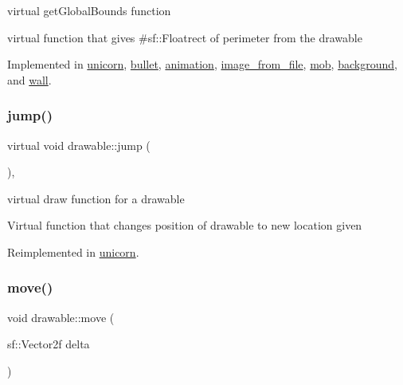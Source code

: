virtual get\+Global\+Bounds function 

virtual function that gives \#sf\+::\+Floatrect of perimeter from the drawable 

Implemented in \hyperlink{classunicorn_a1bac09fc59b04f14f5a093bc4daa04da}{unicorn}, \hyperlink{classbullet_a87bda5887249e8e37c5579180449bd93}{bullet}, \hyperlink{classanimation_aae3322323bf3dea83723969f364e18e0}{animation}, \hyperlink{classimage__from__file_a971a591f906fa5c6e85b4e32cfc3d6a0}{image\+\_\+from\+\_\+file}, \hyperlink{classmob_af3859378fad2a5f93a1c4d833ff74d5d}{mob}, \hyperlink{classbackground_ab5f2b627cd58e0d07678f0af01c6bd2d}{background}, and \hyperlink{classwall_a317a464c879cfdf9464bd6f1b62d9101}{wall}.

\mbox{\label{classdrawable_ac39691470b7874f5dec59efe649d3981}} 
\subsubsection{\texorpdfstring{jump()}{jump()}}
{\footnotesize\ttfamily virtual void drawable\+::jump (\begin{DoxyParamCaption}{ }\end{DoxyParamCaption})\hspace{0.3cm}{\ttfamily [inline]}, {\ttfamily [virtual]}}



virtual draw function for a drawable 

Virtual function that changes position of drawable to new location given 

Reimplemented in \hyperlink{classunicorn_a07d5ca4e66632c0e871221a27146805a}{unicorn}.

\mbox{\label{classdrawable_ad0d3930c045cc6776aa2c3965be32491}} 
\subsubsection{\texorpdfstring{move()}{move()}}
{\footnotesize\ttfamily void drawable\+::move (\begin{DoxyParamCaption}\item[{sf\+::\+Vector2f}]{delta }\end{DoxyParamCaption})\hspace{0.3cm}{\ttfamily [virtual]}}



